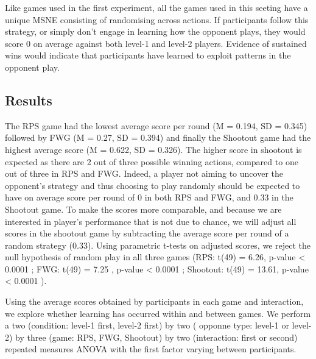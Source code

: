 \documentclass[man,floatsintext]{apa6}
\begin{document}
Like games used in the first experiment, all the games used in this seeting have a unique MSNE consisting of randomising across actions. If participants follow this strategy, or simply don't engage in learning how the opponent plays, they would score 0 on average against both level-1 and level-2 players. Evidence of sustained wins would indicate that participants have learned to exploit patterns in the opponent play.

\hypertarget{results-1}{%
\subsection{Results}\label{results-1}}

The RPS game had the lowest average score per round (M = 0.194, SD = 0.345) followed by FWG (M = 0.27, SD = 0.394) and finally the Shootout game had the highest average score (M = 0.622, SD = 0.326). The higher score in shootout is expected as there are 2 out of three possible winning actions, compared to one out of three in RPS and FWG. Indeed, a player not aiming to uncover the opponent's strategy and thus choosing to play randomly should be expected to have on average score per round of 0 in both RPS and FWG, and 0.33 in the Shootout game. To make the scores more comparable, and because we are interested in player's performance that is not due to chance, we will adjust all scores in the shootout game by subtracting the average score per round of a random strategy (0.33). Using parametric t-tests on adjusted scores, we reject the null hypothesis of random play in all three games (RPS: t(49) = 6.26, p-value \textless{} 0.0001 ; FWG: t(49) = 7.25 , p-value \textless{} 0.0001 ; Shootout: t(49) = 13.61, p-value \textless{} 0.0001 ).

Using the average scores obtained by participants in each game and interaction, we explore whether learning has occurred within and between games. We perform a two (condition: level-1 first, level-2 first) by two ( opponne type: level-1 or level-2) by three (game: RPS, FWG, Shootout) by two (interaction: first or second) repeated measures ANOVA with the first factor varying between participants.
\end{document}

